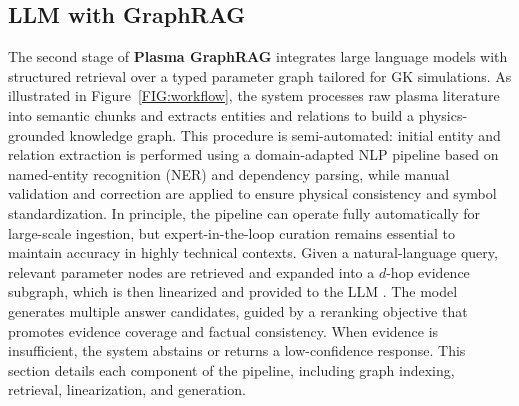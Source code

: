\documentclass[journal]{IEEEtran}
\begin{document}





\subsection{LLM with GraphRAG}

The second stage of \textbf{Plasma GraphRAG} integrates large language models with structured retrieval over a typed parameter graph tailored for GK simulations. As illustrated in Figure~\ref{FIG:workflow}, {the system processes raw plasma literature into semantic chunks and extracts entities and relations to build a physics-grounded knowledge graph. This procedure is semi-automated: initial entity and relation extraction is performed using a domain-adapted NLP pipeline 
based on named-entity recognition (NER) and dependency parsing, while manual validation and correction are applied to ensure physical consistency and symbol standardization. In principle, the pipeline can operate fully automatically for large-scale ingestion, 
but expert-in-the-loop curation remains essential to maintain accuracy in highly technical contexts.} Given a natural-language query, relevant parameter nodes are retrieved and expanded into a $d$-hop evidence subgraph, which is then linearized and provided to the LLM \cite{wu2024retrieval}. The model generates multiple answer candidates, guided by a reranking objective that promotes evidence coverage and factual consistency. When evidence is insufficient, the system abstains or returns a low-confidence response. This section details each component of the pipeline, including graph indexing, retrieval, linearization, and generation.
\end{document}
